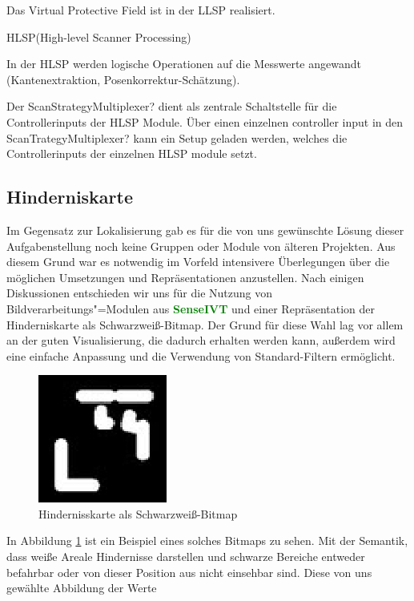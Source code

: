 Das Virtual Protective Field ist in der LLSP realisiert.

HLSP(High-level Scanner Processing)

In der HLSP werden logische Operationen auf die Messwerte angewandt (Kantenextraktion, Posenkorrektur-Schätzung).

Der ScanStrategyMultiplexer? dient als zentrale Schaltstelle für die Controllerinputs der HLSP Module.
 Über einen einzelnen controller input in den ScanTrategyMultiplexer? kann ein Setup geladen werden,
 welches die Controllerinputs der einzelnen HLSP module setzt.  

\subsection{Hinderniskarte}
 Im Gegensatz zur Lokalisierung gab es für die von uns gewünschte Lösung dieser
 Aufgabenstellung noch keine Gruppen oder Module von älteren Projekten. Aus
 diesem Grund war es notwendig im Vorfeld intensivere Überlegungen über die möglichen
 Umsetzungen und Repräsentationen anzustellen.
 Nach einigen Diskussionen entschieden wir uns für die Nutzung von
 Bildverarbeitungs"=Modulen aus \textcolor{green}{\textbf{SenseIVT}}  und
 einer Repräsentation der Hinderniskarte als Schwarzweiß-Bitmap. Der Grund für diese Wahl lag vor allem an der guten
 Visualisierung, die dadurch erhalten werden kann, außerdem wird eine einfache Anpassung und die Verwendung
 von Standard-Filtern ermöglicht. 
\begin{figure}[h]
\center
\includegraphics[scale=0.7]{graphics/hinderniskarte.jpg}
\caption{\label{fig:hinderniskarte} Hindernisskarte als Schwarzweiß-Bitmap}
\end{figure}
 In Abbildung \ref{fig:hinderniskarte} ist ein Beispiel eines solches Bitmaps
 zu sehen. Mit der Semantik, dass weiße Areale Hindernisse darstellen und schwarze Bereiche entweder befahrbar
 oder von dieser Position aus nicht einsehbar sind. Diese von uns gewählte Abbildung der Werte
